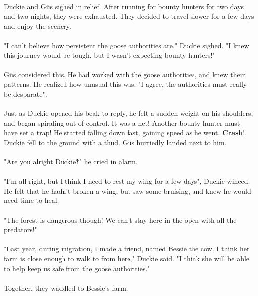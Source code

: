 \paragraph{} Duckie and Güs sighed in relief. After running for bounty hunters for two days and two nights, they were exhausted. They decided to travel slower for a few days and enjoy the scenery. 
\paragraph{} "I can't believe how persistent the goose authorities are." Duckie sighed. "I knew this journey would be tough, but I wasn't expecting bounty hunters!"
\paragraph{} Güs considered this. He had worked with the goose authorities, and knew their patterns. He realized how unusual this was. "I agree, the authorities must really be desparate".
\paragraph{} Just as Duckie opened his beak to reply, he felt a sudden weight on his shoulders, and began spiraling out of control. It was a net! Another bounty hunter must have set a trap! He started falling down fast, gaining speed as he went. \textbf{Crash}!. Duckie fell to the ground with a thud. Güs hurriedly landed next to him. 
\paragraph{} "Are you alright Duckie‽" he cried in alarm.
\paragraph{} "I'm all right, but I think I need to rest my wing for a few days", Duckie winced. He felt that he hadn't broken a wing, but saw some bruising, and knew he would need time to heal. 
 \paragraph{} "The forest is dangerous though! We can't stay here in the open with all the predators!"
 \paragraph{} "Last year, during migration, I made a friend, named Bessie the cow. I think her farm is close enough to walk to from here," Duckie said. "I think she will be able to help keep us safe from the goose authorities."
 \paragraph{} Together, they waddled to Bessie's farm.